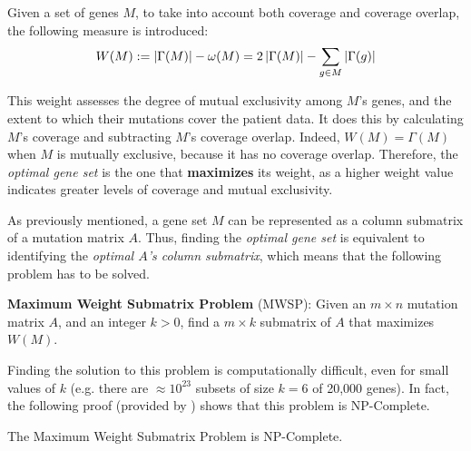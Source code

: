 \begin{definition} \label{weight}
    Given a set of genes $M$, to take into account both coverage and coverage overlap, the following measure is introduced: $$W(M): = \left|\Gamma(M)\right| - \omega(M) = 2 \left|\Gamma(M)\right| - \sum_{g \in M} {\left|\Gamma(g)\right|}$$
\end{definition}

This weight assesses the degree of mutual exclusivity among $M$'s genes, and the extent to which their mutations cover the patient data. It does this by calculating $M$'s coverage and subtracting $M$'s coverage overlap. Indeed, $W(M) = \Gamma(M)$ when $M$ is mutually exclusive, because it has no coverage overlap. Therefore, the \textit{optimal gene set} is the one that \textbf{maximizes} its weight, as a higher weight value indicates greater levels of coverage and mutual exclusivity.

As previously mentioned, a gene set $M$ can be represented as a column submatrix of a mutation matrix $A$. Thus, finding the \textit{optimal gene set} is equivalent to identifying the \textit{optimal $A$'s column submatrix}, which means that the following problem has to be solved.

\begin{displayquote}\label{mwsp}
    \textbf{Maximum Weight Submatrix Problem} (MWSP): Given an $m \times n$ mutation matrix $A$, and an integer $k > 0$, find a $m \times k$ submatrix of $A$ that maximizes $W(M)$.
\end{displayquote}

Finding the solution to this problem is computationally difficult, even for small values of $k$ (e.g. there are $\approx 10^{23}$ subsets of size $k = 6$ of 20,000 genes). In fact, the following proof (provided by \textcite{dendrix}) shows that this problem is NP-Complete.

\begin{theorem} \label{mwsp proof} 
    The Maximum Weight Submatrix Problem is NP-Complete.
\end{theorem}

